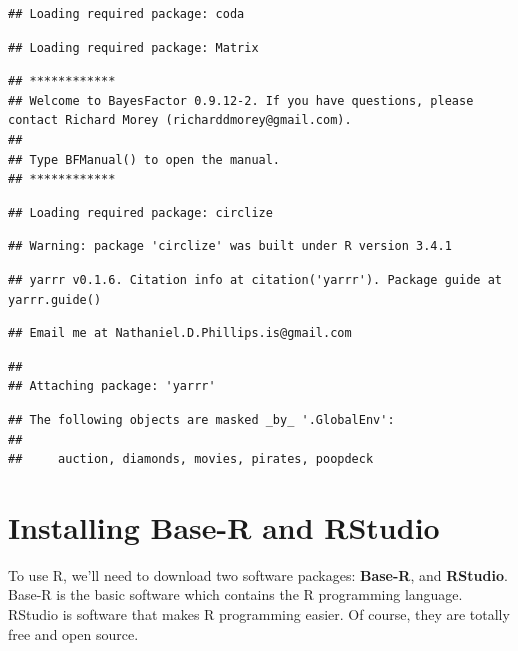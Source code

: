 \documentclass[]{book}
\theoremstyle{definition}
\theoremstyle{definition}
\theoremstyle{remark}
\begin{document}
\begin{verbatim}
## Loading required package: coda
\end{verbatim}

\begin{verbatim}
## Loading required package: Matrix
\end{verbatim}

\begin{verbatim}
## ************
## Welcome to BayesFactor 0.9.12-2. If you have questions, please contact Richard Morey (richarddmorey@gmail.com).
## 
## Type BFManual() to open the manual.
## ************
\end{verbatim}

\begin{verbatim}
## Loading required package: circlize
\end{verbatim}

\begin{verbatim}
## Warning: package 'circlize' was built under R version 3.4.1
\end{verbatim}

\begin{verbatim}
## yarrr v0.1.6. Citation info at citation('yarrr'). Package guide at yarrr.guide()
\end{verbatim}

\begin{verbatim}
## Email me at Nathaniel.D.Phillips.is@gmail.com
\end{verbatim}

\begin{verbatim}
## 
## Attaching package: 'yarrr'
\end{verbatim}

\begin{verbatim}
## The following objects are masked _by_ '.GlobalEnv':
## 
##     auction, diamonds, movies, pirates, poopdeck
\end{verbatim}

\section{Installing Base-R and
RStudio}\label{installing-base-r-and-rstudio}

To use R, we'll need to download two software packages: \textbf{Base-R},
and \textbf{RStudio}. Base-R is the basic software which contains the R
programming language. RStudio is software that makes R programming
easier. Of course, they are totally free and open source.
\end{document}
